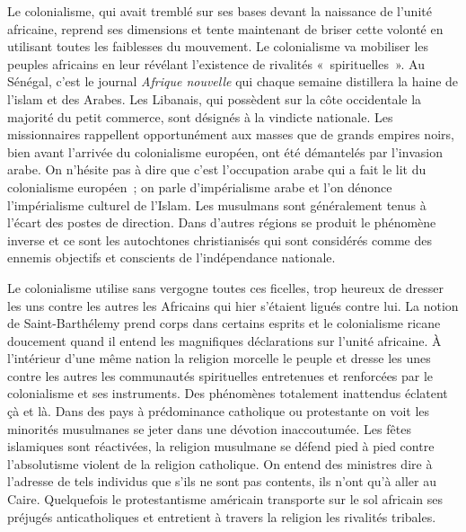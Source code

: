\documentclass[french,twoside]{book} %
\begin{document}
\bigbreak
\noindent Le colonialisme, qui avait tremblé sur ses bases devant la naissance de l’unité africaine, reprend ses dimensions et tente maintenant de briser cette volonté en utilisant toutes les faiblesses du mouvement. Le colonialisme va mobiliser les peuples africains en leur révélant l’existence de rivalités « spirituelles ». Au Sénégal, c’est le journal \emph{Afrique nouvelle} qui chaque semaine distillera la haine de l’islam et des Arabes. Les Libanais, qui possèdent sur la côte occidentale la majorité du petit commerce, sont désignés à la vindicte nationale. Les missionnaires rappellent opportunément aux masses que de grands empires noirs, bien avant l’arrivée du colonialisme européen, ont été démantelés par l’invasion arabe. On n’hésite pas à dire que c’est l’occupation arabe qui a fait le lit du colonialisme européen ; on parle d’impérialisme arabe et l’on dénonce l’impérialisme culturel de l’Islam. Les musulmans sont généralement tenus à l’écart des postes de direction. Dans d’autres régions se produit le phénomène inverse et ce sont les autochtones christianisés qui sont considérés   comme des ennemis objectifs et conscients de l’indépendance nationale.\par
Le colonialisme utilise sans vergogne toutes ces ficelles, trop heureux de dresser les uns contre les autres les Africains qui hier s’étaient ligués contre lui. La notion de Saint-Barthélemy prend corps dans certains esprits et le colonialisme ricane doucement quand il entend les magnifiques déclarations sur l’unité africaine. À l’intérieur d’une même nation la religion morcelle le peuple et dresse les unes contre les autres les communautés spirituelles entretenues et renforcées par le colonialisme et ses instruments. Des phénomènes totalement inattendus éclatent çà et là. Dans des pays à prédominance catholique ou protestante on voit les minorités musulmanes se jeter dans une dévotion inaccoutumée. Les fêtes islamiques sont réactivées, la religion musulmane se défend pied à pied contre l’absolutisme violent de la religion catholique. On entend des ministres dire à l’adresse de tels individus que s’ils ne sont pas contents, ils n’ont qu’à aller au Caire. Quelquefois le protestantisme américain transporte sur le sol africain ses préjugés anticatholiques et entretient à travers la religion les rivalités tribales.\par
\bigbreak
\end{document}
